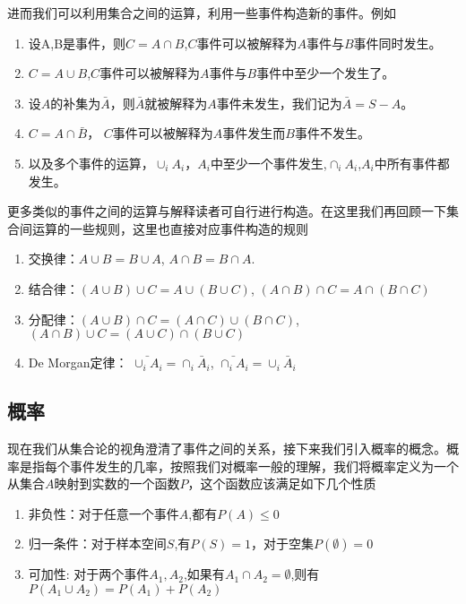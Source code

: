 进而我们可以利用集合之间的运算，利用一些事件构造新的事件。例如
\begin{enumerate}
\item 设A,B是事件，则$C = A \cap B$,$C$事件可以被解释为$A$事件与$B$事件同时发生。
\item $C = A \cup B$,$C$事件可以被解释为$A$事件与$B$事件中至少一个发生了。
\item 设$A$的补集为$\bar{A}$，则$\bar{A}$就被解释为$A$事件未发生，我们记为$\bar{A}=S-A$。
\item $C = A \cap \bar{B}$， $C$事件可以被解释为$A$事件发生而$B$事件不发生。
\item 以及多个事件的运算，$\cup_i A_i$，$A_i$中至少一个事件发生,$\cap_i A_i$,$A_i$中所有事件都发生。
\end{enumerate}
更多类似的事件之间的运算与解释读者可自行进行构造。在这里我们再回顾一下集合间运算的一些规则，这里也直接对应事件构造的规则
\begin{enumerate}
\item 交换律：$A \cup B = B \cup A$, $A \cap B = B \cap A$.
\item 结合律：$(A \cup B)\cup C = A \cup (B \cup C)$, $(A \cap B)\cap C = A \cap (B\cap C)$
\item 分配律：$(A\cup B)\cap C = (A \cap C) \cup (B \cap C)$, $(A\cap B) \cup C = (A \cup C)\cap (B \cup C)$
\item De Morgan定律： $\bar{\cup_i A_i} = \cap_i \bar{A}_i$, $\bar{\cap_i A_i} = \cup_i \bar{A}_i$
\end{enumerate}
\subsection{概率}
现在我们从集合论的视角澄清了事件之间的关系，接下来我们引入概率的概念。概率是指每个事件发生的几率，按照我们对概率一般的理解，我们将概率定义为一个从集合$A$映射到实数的一个函数$P$，这个函数应该满足如下几个性质
\begin{enumerate}
\item 非负性：对于任意一个事件$A$,都有$P(A)\leq 0$
\item 归一条件：对于样本空间$S$,有$P(S) = 1$，对于空集$P(\emptyset) = 0$
\item 可加性: 对于两个事件$A_1,A_2$,如果有$A_1 \cap A_2 = \emptyset$,则有 $P(A_1 \cup A_2) = P(A_1)+P(A_2)$
\end{enumerate}


